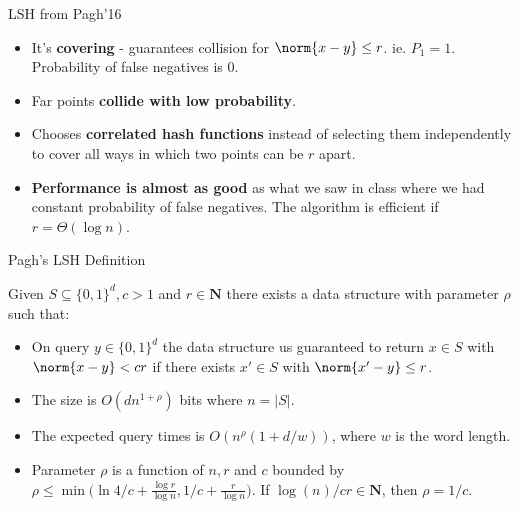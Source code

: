 \documentclass[xcolor=svgnames]{beamer}
\begin{document}
\begin{frame}{LSH from Pagh'16}
\begin{itemize}
    \item It's \textbf{covering} - guarantees collision for $\norm{x-y} \leq r$. ie. $P_1 = 1$. Probability of false negatives is 0.
    \pause
    \item Far points \textbf{collide with low probability}.
    \pause
    \item Chooses \textbf{correlated hash functions} instead of selecting them independently to cover all ways in which two points can be $r$ apart.
    \pause
    \item \textbf{Performance is almost as good} as what we saw in class where we had constant probability of false negatives. The algorithm is efficient if $r = \Theta(\log{n})$.
\end{itemize}
\end{frame}

\begin{frame}{Pagh's LSH Definition}
\begin{theorem*}
[Pagh'16] Given $S \subseteq \{0,1\}^d, c>1$ and $r \in \mathbf{N}$ there exists a data structure with parameter $\rho$ such that:
\begin{itemize}
	\item {\color{important}\large{On query $y \in \{0,1\}^d$ the data structure us guaranteed to return $x \in S$ with $\norm{x-y} < cr$ if there exists $x' \in S$ with $\norm{x'-y} \leq r$.}}
	\item The size is $O(dn^{1+\rho})$ bits where $n = |S|$.
	\item The expected query times is $O(n^\rho(1+d/w))$, where $w$ is the word length.
	\item Parameter $\rho$ is a function of $n, r$ and $c$ bounded by $\rho \leq \min{\Big(\ln{4}/c + \frac{\log{r}}{\log{n}}, 1/c + \frac{r}{\log{n}}\Big)}$. {\color{important} \large{If $\log{(n)}/cr \in \mathbf{N}$, then $\rho = 1/c$.}}
\end{itemize}
\end{theorem*}
\end{frame}
\end{document}
